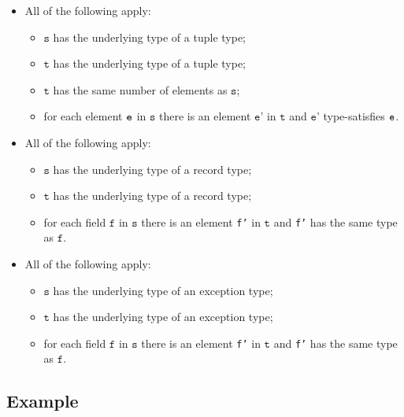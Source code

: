 \documentclass{book}
\newcommand\vf[0]{\texttt{f}}
\newcommand\vt[0]{\texttt{t}}
\newcommand\vs[0]{\texttt{s}}
\newcommand\vep[0]{\texttt{e'}}
\begin{document}
\begin{itemize}
  \item All of the following apply:
    \begin{itemize}
    \item $\vs$ has the underlying type of a tuple type;
    \item $\vt$ has the underlying type of a tuple type;
    \item $\vt$ has the same number of elements as $\vs$;
    \item for each element $\texttt{e}$ in $\vs$ there is an element $\vep$ in $\vt$ and $\vep$
      type-satisfies $\texttt{e}$.
    \end{itemize}

  \item All of the following apply:
    \begin{itemize}
    \item $\vs$ has the underlying type of a record type;
    \item $\vt$ has the underlying type of a record type;
    \item for each field $\vf$ in $\vs$ there is an element \texttt{f'} in $\vt$ and \texttt{f'} has
      the same type as $\vf$.
    \end{itemize}

  \item All of the following apply:
    \begin{itemize}
    \item $\vs$ has the underlying type of an exception type;
    \item $\vt$ has the underlying type of an exception type;
    \item for each field $\vf$ in $\vs$ there is an element \texttt{f'} in $\vt$ and \texttt{f'} has
      the same type as $\vf$.
    \end{itemize}
  \end{itemize}

\subsection{Example}

\end{document}
